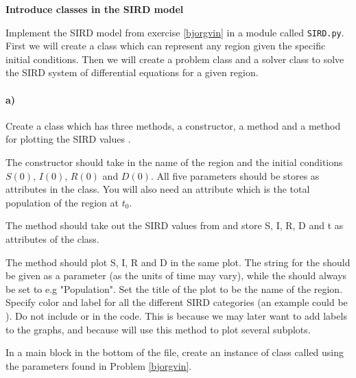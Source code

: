 \begin{Problem}{\textbf{Introduce classes in the SIRD model}}\label{SIRD}

\noindent
Implement the SIRD model from exercise \ref{bjorgvin} in a module called \texttt{SIRD.py}. First we will create a class  which can represent any region given the specific initial conditions. Then we will create a problem class  and a solver class  to solve the SIRD system of differential equations for a given region.

\paragraph{a)}
Create a class  which has three methods, a constructor, a method  and a method for plotting the SIRD values .

The constructor should take in the name of the region and the initial conditions $S(0)$, $I(0)$, $R(0)$ and  $D(0)$. All five parameters should be stores as attributes in the class. You will also need an attribute  which is the total population of the region at $t_0$. 

The method  should take out the SIRD values from  and store S, I, R, D and t as attributes of the class. 

The method  should plot S, I, R and D in the same plot. The string for the  should be given as a parameter (as the units of time may vary), while the  should always be set to e.g "Population". Set the title of the plot to be the name of the region. Specify color and label for all the different SIRD categories (an example could be \newline {}). Do not include  or  in the code. This is because we may later want to add labels to the graphs, and because will use this method to plot several subplots. 

In a main block in the bottom of the file, create an instance of class  called  using the parameters found in Problem \ref{bjorgvin}. 


\end{Problem}
